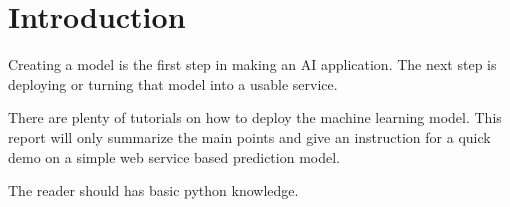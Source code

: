 
\section{Introduction}

Creating a model is the first step in making an AI application. The next step is deploying or turning that model into a usable service.

There are plenty of tutorials on how to deploy the machine learning model. This report will only summarize the main points and give an instruction for  a quick demo on a simple web service based prediction model.

The reader should has basic python knowledge. 

\newpage
